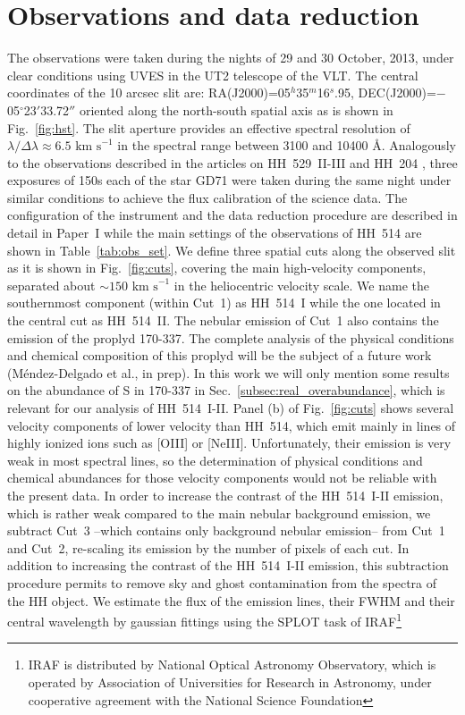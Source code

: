 \documentclass[fleqn,usenatbib]{mnras}
\begin{document}
\section{Observations and data reduction}
\label{sec:data}

The observations were taken during the nights of 29 and 30 October, 2013, under clear conditions using UVES in the UT2 telescope of the VLT. The central coordinates of the 10 arcsec slit are: RA(J2000)=05$^h$35$^m$16$^s$.95, DEC(J2000)=$-$05$^{\circ}$23$'$33.72$''$ oriented along the north-south spatial axis as is shown in Fig.~\ref{fig:hst}. The slit aperture provides an effective spectral resolution of $\lambda/\Delta \lambda \approx 6.5 \text{ km s}^{-1}$ in the spectral range between 3100 and 10400 \AA. Analogously to the observations described in the articles on HH~529~II-III and HH~204 \citep[][hereinafter Paper~I and Paper~II, respectively]{mendez2021,mendez2021-2}, three exposures of 150s each of the star GD71 \citep{Moehler14a, Moehler14b} were taken during the same night under similar conditions to achieve the flux calibration of the science data. The configuration of the instrument and the data reduction procedure are described in detail in Paper~I while the main settings of the observations of HH~514 are shown in Table~\ref{tab:obs_set}. We define three spatial cuts along the observed slit as it is shown in Fig.~\ref{fig:cuts}, covering the main high-velocity components, separated about $\sim 150\text{ km s}^{-1}$ in the heliocentric velocity scale. We name the southernmost component (within Cut~1) as HH~514~I while the one located in the central cut as HH~514~II. The nebular emission of Cut~1 also contains the emission of the proplyd 170-337. The complete analysis of the physical conditions and chemical composition of this proplyd will be the subject of a future work (M\'endez-Delgado et al., in prep). In this work we will only mention some results on the abundance of S in 170-337 in Sec.~\ref{subsec:real_overabundance}, which is relevant for our analysis of HH~514~I-II. Panel (b) of Fig.~\ref{fig:cuts} shows several velocity components of lower velocity than HH~514, which emit mainly in lines of highly ionized ions such as [O\thinspace III] or [Ne\thinspace III]. Unfortunately, their emission is very weak in most spectral lines, so the determination of physical conditions and chemical abundances for those velocity components would not be reliable with the present data. In order to increase the contrast of the HH~514~I-II emission, which is rather weak compared to the main nebular background emission, we subtract Cut~3 --which contains only background nebular emission-- from Cut~1 and Cut~2, re-scaling its emission by the number of pixels of each cut. In addition to increasing the contrast of the HH~514~I-II emission, this subtraction procedure permits to remove sky and ghost contamination from the spectra of the HH object. We estimate the flux of the emission lines, their FWHM and their central wavelength by gaussian fittings using the SPLOT task of IRAF\footnote{IRAF is distributed by National Optical Astronomy Observatory, which is operated by Association of Universities for Research in Astronomy, under cooperative agreement with the National Science Foundation} \citep{Tody93} 
\end{document}
